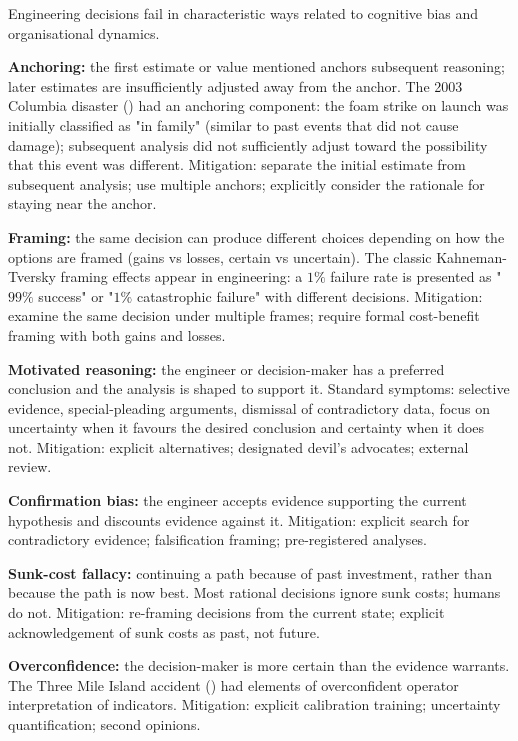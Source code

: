 Engineering decisions fail in characteristic ways related to cognitive bias and organisational dynamics.

\textbf{Anchoring:} the first estimate or value mentioned anchors subsequent reasoning; later estimates are insufficiently adjusted away from the anchor. The 2003 Columbia disaster (\cite{acc:caib-columbia}) had an anchoring component: the foam strike on launch was initially classified as "in family" (similar to past events that did not cause damage); subsequent analysis did not sufficiently adjust toward the possibility that this event was different. Mitigation: separate the initial estimate from subsequent analysis; use multiple anchors; explicitly consider the rationale for staying near the anchor.

\textbf{Framing:} the same decision can produce different choices depending on how the options are framed (gains vs losses, certain vs uncertain). The classic Kahneman-Tversky framing effects appear in engineering: a $1\%$ failure rate is presented as "$99\%$ success" or "$1\%$ catastrophic failure" with different decisions. Mitigation: examine the same decision under multiple frames; require formal cost-benefit framing with both gains and losses.

\textbf{Motivated reasoning:} the engineer or decision-maker has a preferred conclusion and the analysis is shaped to support it. Standard symptoms: selective evidence, special-pleading arguments, dismissal of contradictory data, focus on uncertainty when it favours the desired conclusion and certainty when it does not. Mitigation: explicit alternatives; designated devil's advocates; external review.

\textbf{Confirmation bias:} the engineer accepts evidence supporting the current hypothesis and discounts evidence against it. Mitigation: explicit search for contradictory evidence; falsification framing; pre-registered analyses.

\textbf{Sunk-cost fallacy:} continuing a path because of past investment, rather than because the path is now best. Most rational decisions ignore sunk costs; humans do not. Mitigation: re-framing decisions from the current state; explicit acknowledgement of sunk costs as past, not future.

\textbf{Overconfidence:} the decision-maker is more certain than the evidence warrants. The Three Mile Island accident (\cite{acc:kemeny-tmi-1979}) had elements of overconfident operator interpretation of indicators. Mitigation: explicit calibration training; uncertainty quantification; second opinions.

